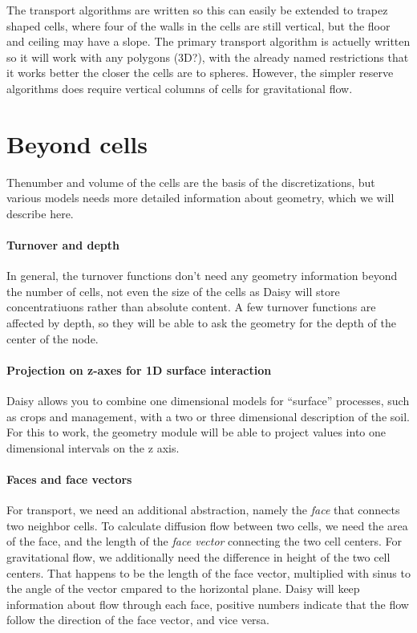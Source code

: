 \documentclass[a4paper,11pt,twoside]{article}
\begin{document}
The transport algorithms are written so this can easily be extended to
trapez shaped cells, where four of the walls in the cells are still
vertical, but the floor and ceiling may have a slope.  The primary
transport algorithm is actuelly written so it will work with any
polygons (3D?), with the already named restrictions that it works
better the closer the cells are to spheres.  However, the simpler
reserve algorithms does require vertical columns of cells for
gravitational flow.

\section{Beyond cells}

Thenumber and volume of the cells are the basis of the
discretizations, but various models needs more detailed information
about geometry, which we will describe here.

\paragraph{Turnover and depth}
In general, the turnover functions don't need any geometry information
beyond the number of cells, not even the size of the cells as Daisy
will store concentratiuons rather than absolute content.  A few
turnover functions are affected by depth, so they will be able to ask
the geometry for the depth of the center of the node.

\paragraph{Projection on z-axes for 1D surface interaction}
Daisy allows you to combine one dimensional models for ``surface''
processes, such as crops and management, with a two or three
dimensional description of the soil.  For this to work, the geometry
module will be able to project values into one dimensional intervals
on the z axis.

\paragraph{Faces and face vectors}
For transport, we need an additional abstraction, namely the
\emph{face} that connects two neighbor cells.  To calculate diffusion
flow between two cells, we need the area of the face, and the length
of the \emph{face vector} connecting the two cell centers.  For
gravitational flow, we additionally need the difference in height of
the two cell centers.  That happens to be the length of the face
vector, multiplied with sinus to the angle of the vector cmpared to
the horizontal plane.  Daisy will keep information about flow through
each face, positive numbers indicate that the flow follow the
direction of the face vector, and vice versa.
\end{document}
